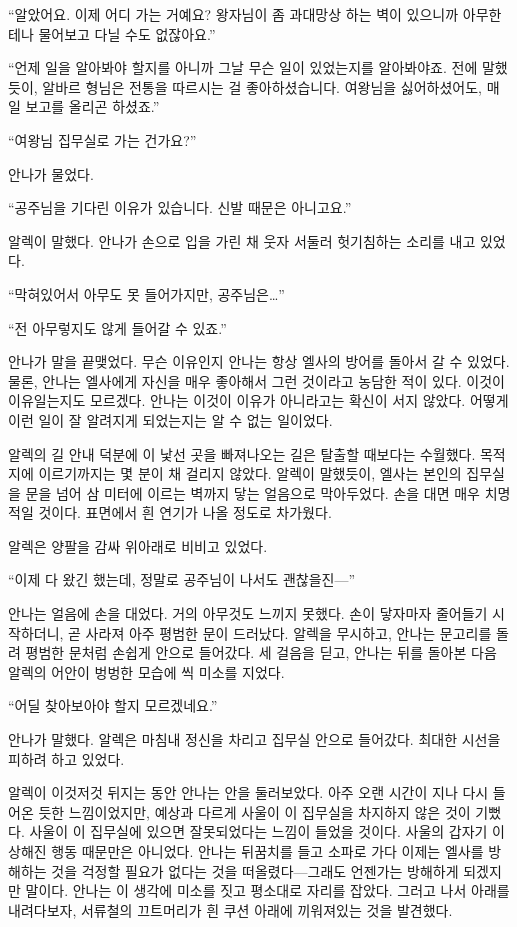 ``알았어요. 이제 어디 가는 거예요? 왕자님이 좀 과대망상 하는 벽이 있으니까 아무한테나 물어보고 다닐 수도 없잖아요.''

``언제 일을 알아봐야 할지를 아니까 그날 무슨 일이 있었는지를 알아봐야죠. 전에 말했듯이, 알바르 형님은 전통을 따르시는 걸 좋아하셨습니다. 여왕님을 싫어하셨어도, 매일 보고를 올리곤 하셨죠.''

``여왕님 집무실로 가는 건가요?''

안나가 물었다.

``공주님을 기다린 이유가 있습니다. 신발 때문은 아니고요.''

알렉이 말했다. 안나가 손으로 입을 가린 채 웃자 서둘러 헛기침하는 소리를 내고 있었다.

``막혀있어서 아무도 못 들어가지만, 공주님은\ldots''

``전 아무렇지도 않게 들어갈 수 있죠.''

안나가 말을 끝맺었다. 무슨 이유인지 안나는 항상 엘사의 방어를 돌아서 갈 수 있었다. 물론, 안나는 엘사에게 자신을 매우 좋아해서 그런 것이라고 농담한 적이 있다. 이것이 이유일는지도 모르겠다. 안나는 이것이 이유가 아니라고는 확신이 서지 않았다. 어떻게 이런 일이 잘 알려지게 되었는지는 알 수 없는 일이었다.

알렉의 길 안내 덕분에 이 낯선 곳을 빠져나오는 길은 탈출할 때보다는 수월했다. 목적지에 이르기까지는 몇 분이 채 걸리지 않았다. 알렉이 말했듯이, 엘사는 본인의 집무실을 문을 넘어 삼 미터에 이르는 벽까지 닿는 얼음으로 막아두었다. 손을 대면 매우 치명적일 것이다. 표면에서 흰 연기가 나올 정도로 차가웠다.

알렉은 양팔을 감싸 위아래로 비비고 있었다.

``이제 다 왔긴 했는데, 정말로 공주님이 나서도 괜찮을진—''

안나는 얼음에 손을 대었다. 거의 아무것도 느끼지 못했다. 손이 닿자마자 줄어들기 시작하더니, 곧 사라져 아주 평범한 문이 드러났다. 알렉을 무시하고, 안나는 문고리를 돌려 평범한 문처럼 손쉽게 안으로 들어갔다. 세 걸음을 딛고, 안나는 뒤를 돌아본 다음 알렉의 어안이 벙벙한 모습에 씩 미소를 지었다.

``어딜 찾아보아야 할지 모르겠네요.''

안나가 말했다. 알렉은 마침내 정신을 차리고 집무실 안으로 들어갔다. 최대한 시선을 피하려 하고 있었다.

알렉이 이것저것 뒤지는 동안 안나는 안을 둘러보았다. 아주 오랜 시간이 지나 다시 들어온 듯한 느낌이었지만, 예상과 다르게 사울이 이 집무실을 차지하지 않은 것이 기뻤다. 사울이 이 집무실에 있으면 잘못되었다는 느낌이 들었을 것이다. 사울의 갑자기 이상해진 행동 때문만은 아니었다. 안나는 뒤꿈치를 들고 소파로 가다 이제는 엘사를 방해하는 것을 걱정할 필요가 없다는 것을 떠올렸다—그래도 언젠가는 방해하게 되겠지만 말이다. 안나는 이 생각에 미소를 짓고 평소대로 자리를 잡았다. 그러고 나서 아래를 내려다보자, 서류철의 끄트머리가 흰 쿠션 아래에 끼워져있는 것을 발견했다.

